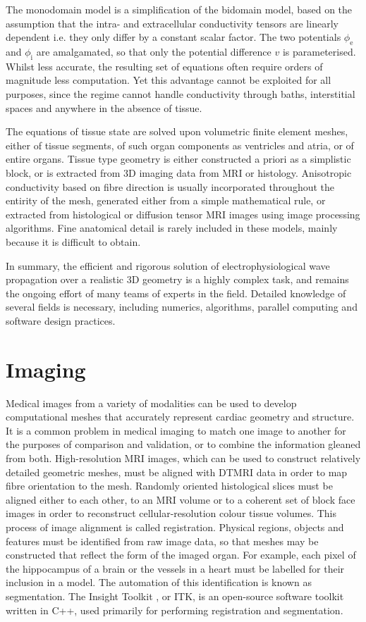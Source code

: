   The monodomain model is a simplification of the bidomain model, based on the assumption that the intra- and extracellular conductivity tensors are linearly dependent i.e. they only differ by a constant scalar factor. The two potentials $\phi_\text{e}$ and $\phi_\text{i}$ are amalgamated, so that only the potential difference $v$ is parameterised. Whilst less accurate, the resulting set of equations often require orders of magnitude less computation. Yet this advantage cannot be exploited for all purposes, since the regime cannot handle conductivity through baths, interstitial spaces and anywhere in the absence of tissue.
  
  The equations of tissue state are solved upon volumetric finite element meshes, either of tissue segments, of such organ components as ventricles and atria, or of entire organs. Tissue type geometry is either constructed a priori as a simplistic block, or is extracted from 3D imaging data from MRI or histology. Anisotropic conductivity based on fibre direction is usually incorporated throughout the entirity of the mesh, generated either from a simple mathematical rule, or extracted from histological or diffusion tensor MRI images using image processing algorithms. Fine anatomical detail is rarely included in these models, mainly because it is difficult to obtain.
    
  In summary, the efficient and rigorous solution of electrophysiological wave propagation over a realistic 3D geometry is a highly complex task, and remains the ongoing effort of many teams of experts in the field. Detailed knowledge of several fields is necessary, including numerics, algorithms, parallel computing and software design practices.

\section{Imaging}
\label{imaging}
  Medical images from a variety of modalities can be used to develop computational meshes that accurately represent cardiac geometry and structure. It is a common problem in medical imaging to match one image to another for the purposes of comparison and validation, or to combine the information gleaned from both. High-resolution MRI images, which can be used to construct relatively detailed geometric meshes, must be aligned with DTMRI data in order to map fibre orientation to the mesh. Randomly oriented histological slices must be aligned either to each other, to an MRI volume or to a coherent set of block face images in order to reconstruct cellular-resolution colour tissue volumes. This process of image alignment is called registration. Physical regions, objects and features must be identified from raw image data, so that meshes may be constructed that reflect the form of the imaged organ. For example, each pixel of the hippocampus of a brain or the vessels in a heart must be labelled for their inclusion in a model. The automation of this identification is known as segmentation. The Insight Toolkit \cite{Yoo2002}, or ITK, is an open-source software toolkit written in C++, used primarily for performing registration and segmentation.
  
